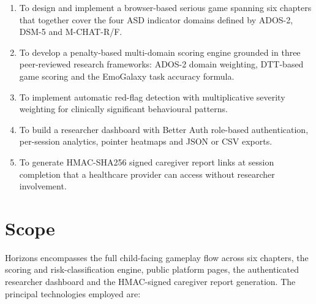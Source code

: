 \documentclass[12pt,a4paper,oneside]{report}
\begin{document}
\begin{enumerate}[leftmargin=0.5in, label=\arabic*.]
  \item To design and implement a browser-based serious game spanning six chapters that together cover the four ASD indicator domains defined by ADOS-2, DSM-5 and M-CHAT-R/F.
  \item To develop a penalty-based multi-domain scoring engine grounded in three peer-reviewed research frameworks: ADOS-2 domain weighting, DTT-based game scoring and the EmoGalaxy task accuracy formula.
  \item To implement automatic red-flag detection with multiplicative severity weighting for clinically significant behavioural patterns.
  \item To build a researcher dashboard with Better Auth role-based authentication, per-session analytics, pointer heatmaps and JSON or CSV exports.
  \item To generate HMAC-SHA256 signed caregiver report links at session completion that a healthcare provider can access without researcher involvement.
\end{enumerate}

\section{Scope}

Horizons encompasses the full child-facing gameplay flow across six chapters, the scoring and risk-classification engine, public platform pages, the authenticated researcher dashboard and the HMAC-signed caregiver report generation. The principal technologies employed are:
\end{document}
